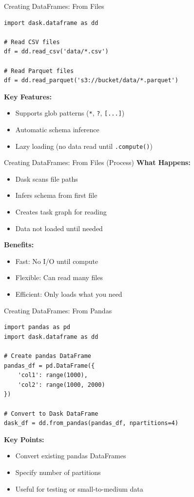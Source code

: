 \documentclass[aspectratio=169]{beamer}
\begin{document}
\begin{frame}[fragile]{Creating DataFrames: From Files}
\small
\begin{lstlisting}[basicstyle=\ttfamily\tiny]
import dask.dataframe as dd

# Read CSV files
df = dd.read_csv('data/*.csv')

# Read Parquet files
df = dd.read_parquet('s3://bucket/data/*.parquet')
\end{lstlisting}

\vspace{0.1cm}
\textbf{Key Features:}
\begin{itemize}
    \item Supports glob patterns (\texttt{*}, \texttt{?}, \texttt{[...]})
    \item Automatic schema inference
    \item Lazy loading (no data read until \texttt{.compute()})
\end{itemize}
\end{frame}

\begin{frame}{Creating DataFrames: From Files (Process)}
\small
\textbf{What Happens:}
\begin{itemize}
    \item Dask scans file paths
    \item Infers schema from first file
    \item Creates task graph for reading
    \item Data not loaded until needed
\end{itemize}

\vspace{0.2cm}
\textbf{Benefits:}
\begin{itemize}
    \item Fast: No I/O until compute
    \item Flexible: Can read many files
    \item Efficient: Only loads what you need
\end{itemize}
\end{frame}

\begin{frame}[fragile]{Creating DataFrames: From Pandas}
\small
\begin{lstlisting}
import pandas as pd
import dask.dataframe as dd

# Create pandas DataFrame
pandas_df = pd.DataFrame({
    'col1': range(1000),
    'col2': range(1000, 2000)
})

# Convert to Dask DataFrame
dask_df = dd.from_pandas(pandas_df, npartitions=4)
\end{lstlisting}

\textbf{Key Points:}
\begin{itemize}
    \item Convert existing pandas DataFrames
    \item Specify number of partitions
    \item Useful for testing or small-to-medium data
\end{itemize}
\end{frame}
\end{document}
